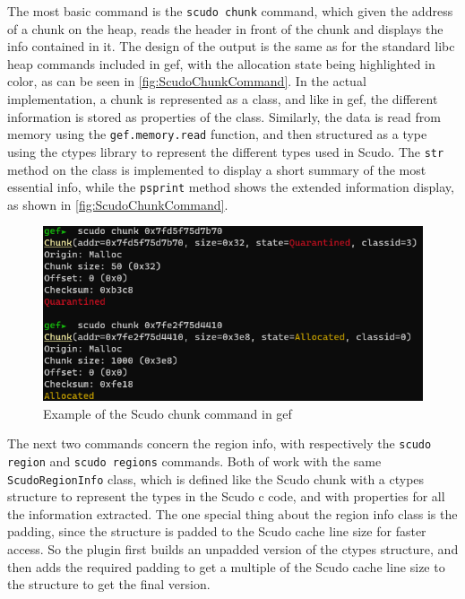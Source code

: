 \documentclass[a4paper,11pt,oneside]{report}
\begin{document}
The most basic command is the \verb|scudo chunk| command, which given the address
of a chunk on the heap, reads the header in front of the chunk and displays
the info contained in it. The design of the output is the same as for the
standard libc heap commands included in gef, with the allocation state being
highlighted in color, as can be seen in \autoref{fig:ScudoChunkCommand}.
In the actual implementation, a chunk is represented as a class, and like in
gef, the different information is stored as properties of the class. Similarly,
the data is read from memory using the \verb|gef.memory.read| function, and then
structured as a type using the ctypes library to represent the different types
used in Scudo. The \verb|str| method on the class is implemented to display a short
summary of the most essential info, while the \verb|psprint| method shows the
extended information display, as shown in \autoref{fig:ScudoChunkCommand}.

\begin{figure}[h!]
  \centering
  \includegraphics[width=\linewidth]{figures/ScudoChunkCommand.png}
  \caption{Example of the Scudo chunk command in gef}
  \label{fig:ScudoChunkCommand}
\end{figure}

The next two commands concern the region info, with respectively the
\verb|scudo region| and \verb|scudo regions| commands. Both of work with the same
\verb|ScudoRegionInfo| class, which is defined like the Scudo chunk with a ctypes
structure to represent the types in the Scudo c code, and with properties for
all the information extracted. The one special thing about the region info
class is the padding, since the structure is padded to the Scudo cache line
size for faster access. So the plugin first builds an unpadded version of the
ctypes structure, and then adds the required padding to get a multiple of the
Scudo cache line size to the structure to get the final version.
\end{document}

